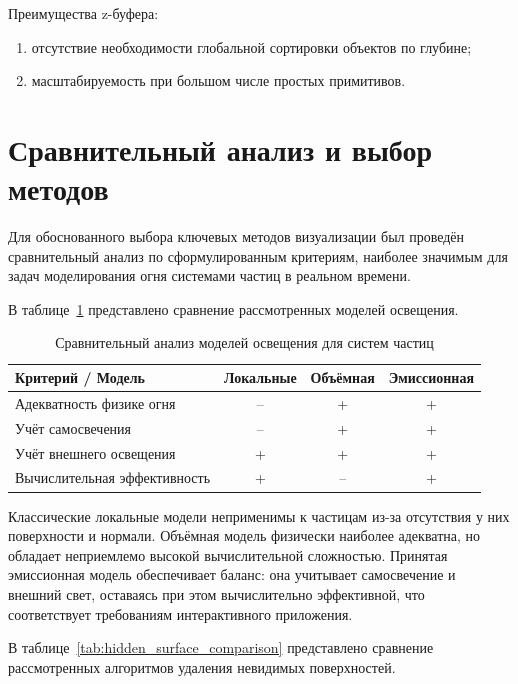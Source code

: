 Преимущества z-буфера:
\begin{enumerate}
	\item отсутствие необходимости глобальной сортировки объектов по глубине;
	\item масштабируемость при большом числе простых примитивов.\cite{RogersAdams}
\end{enumerate}

\section{Сравнительный анализ и выбор методов}
\label{subsec:comparison_and_choice}

Для обоснованного выбора ключевых методов визуализации был проведён сравнительный анализ по сформулированным критериям, наиболее значимым для задач моделирования огня системами частиц в реальном времени.

В таблице~\ref{tab:lighting_comparison} представлено сравнение рассмотренных моделей освещения.

\begin{table}[H]
	\centering
	\small
	\caption{Сравнительный анализ моделей освещения для систем частиц}
	\begin{tabular}{|p{4.5cm}|c|c|c|}
		\hline
		\textbf{Критерий / Модель} & \textbf{Локальные} & \textbf{Объёмная} & \textbf{Эмиссионная} \\
		\hline
		Адекватность физике огня & -- & + & + \\
		\hline
		Учёт самосвечения & -- & + & + \\
		\hline
		Учёт внешнего освещения & + & + & + \\
		\hline
		Вычислительная эффективность & + & -- & + \\
		\hline
	\end{tabular}
	\label{tab:lighting_comparison}
\end{table}

Классические локальные модели неприменимы к частицам из-за отсутствия у них поверхности и нормали. Объёмная модель физически наиболее адекватна, но обладает неприемлемо высокой вычислительной сложностью. Принятая эмиссионная модель обеспечивает баланс: она учитывает самосвечение и внешний свет, оставаясь при этом вычислительно эффективной, что соответствует требованиям интерактивного приложения.

В таблице~\ref{tab:hidden_surface_comparison} представлено сравнение рассмотренных алгоритмов удаления невидимых поверхностей.

